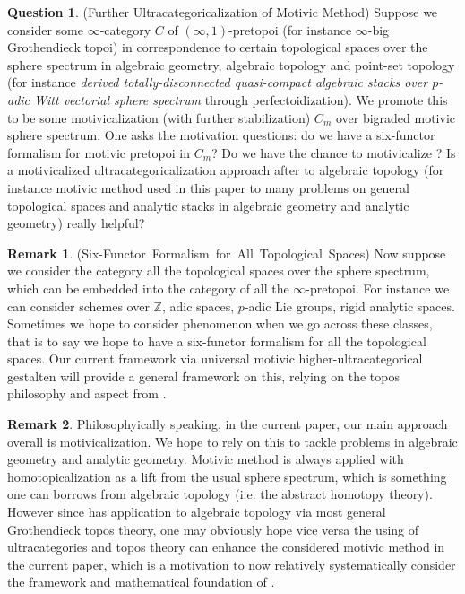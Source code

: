 \documentclass[12pt]{article}
\theoremstyle{definition}
\newtheorem{remark}{Remark}
\newtheorem{question}{Question}
\begin{document}
\begin{question} (Further Ultracategoricalization of Motivic Method)
Suppose we consider some $\infty$-category $C$ of $(\infty,1)$-pretopoi (for instance $\infty$-big Grothendieck topoi) in correspondence to certain topological spaces over the sphere spectrum in algebraic geometry, algebraic topology and point-set topology (for instance \textit{derived totally-disconnected quasi-compact algebraic stacks over $p$-adic Witt vectorial sphere spectrum} through perfectoidization). We promote this to be some motivicalization (with further stabilization) $C_m$ over bigraded motivic sphere spectrum. One asks the motivation questions: do we have a six-functor formalism for motivic pretopoi in $C_m$? Do we have the chance to motivicalize \cite{5Lu3}? Is a motivicalized ultracategoricalization approach after \cite{5Lu3} to algebraic topology (for instance motivic method used in this paper to many problems on general topological spaces and analytic stacks in algebraic geometry and analytic geometry) really helpful?
\end{question}

\begin{remark} \mbox{(Six-Functor Formalism for All Topological Spaces)}
Now suppose we consider the category all the topological spaces over the sphere spectrum, which can be embedded into the category of all the $\infty$-pretopoi. For instance we can consider schemes over $\mathbb{Z}$, adic spaces, $p$-adic Lie groups, rigid analytic spaces. Sometimes we hope to consider phenomenon when we go across these classes, that is to say we hope to have a six-functor formalism for all the topological spaces. Our current framework via universal motivic higher-ultracategorical gestalten will provide a general framework on this, relying on the topos philosophy and aspect from \cite{5Lu3}.
\end{remark}


\begin{remark}
Philosophyically speaking, in the current paper, our main approach overall is motivicalization. We hope to rely on this to tackle problems in algebraic geometry and analytic geometry. Motivic method is always applied with homotopicalization as a lift from the usual sphere spectrum, which is something one can borrows from algebraic topology (i.e. the abstract homotopy theory). However since \cite{5Lu3} has application to algebraic topology via most general Grothendieck topos theory, one may obviously hope vice versa the using of ultracategories and topos theory can enhance the considered motivic method in the current paper, which is a motivation to now relatively systematically consider the framework and mathematical foundation of \cite{5Lu3}.
\end{remark}
\end{document}
